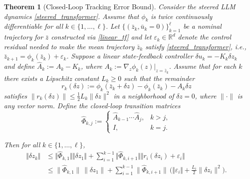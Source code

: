 \documentclass{article}
\theoremstyle{plain}
\newtheorem{theorem}{Theorem}[section]
\theoremstyle{definition}
\theoremstyle{remark}
\begin{document}
\begin{theorem}[Closed-Loop Tracking Error Bound]\label{ap:thm:tracking}
Consider the steered LLM dynamics \eqref{steered_transformer}. Assume that $\phi_k$ is twice continuously differentiable for all $k \in \{1,\ldots,\ell\}$. Let $\{(\bar z_k,\bar u_k=0)\}_{k=1}^\ell$ be a nominal trajectory for $\bar z$ constructed via \eqref{linear_tf} and let $\varepsilon_k \in \mathbb{R}^d$ denote the control residual needed to make the mean trajectory $\bar z_k$ satisfy \eqref{steered_transformer}, i.e., $\bar z_{k+1} = \phi_k(\bar z_k) + \varepsilon_k$.
Suppose a linear state-feedback controller $\delta u_k = -K_k \delta z_k$ and define
$\hat A_k := A_k - K_k$, where $A_k := \nabla_z \phi_k(z)|_{z=\bar z_k}$. Assume that for each $k$ there exists a Lipschitz constant $L_k \ge 0$ such that the remainder
\begin{equation}
    r_k(\delta z) := \phi_k(\bar z_k+\delta z) - \phi_k(\bar z_k) - A_k \delta z
\end{equation}
satisfies
$\|r_k(\delta z)\| \le \frac{1}{2} L_k \|\delta z\|^2$ in a neighborhood of $\delta z = 0$, where $\|\cdot\|$ is any vector norm.
Define the closed-loop transition matrices 
\begin{equation}\label{eq:app_transition_matrices}
    \hat\Phi_{k,j} :=
    \begin{cases}
    \hat A_{k-1} \cdots \hat A_j, & k>j, \\
    I, & k=j.
    \end{cases}
\end{equation}

Then for all $k \in \{1,\ldots, \ell\}$,
\begin{subequations}
    \begin{align}
        \Vert \delta z_k\Vert  &\le  \Vert \hat\Phi_{k,1} \Vert \Vert \delta z_1\Vert  + \sum_{i=1}^{k-1} \Vert \hat\Phi_{k,i+1}\Vert \Vert r_i(\delta z_i)+\varepsilon_i\Vert \\
        &\le \|\hat\Phi_{k,1}\|\,\|\delta z_1\| + \sum_{i=1}^{k-1} \|\hat\Phi_{k,i+1}\|\, \Big(\Vert \varepsilon_i\Vert + \frac{L_i}{2}\|\delta z_i\|^2 \Big).
    \end{align}
\end{subequations}
\end{theorem}
\end{document}
